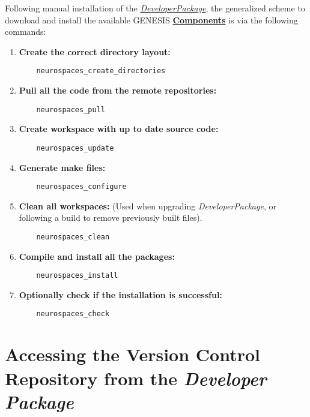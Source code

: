 \documentclass[12pt]{article}
\begin{document}
Following manual installation of the \href{../developer-package/developer-package.tex}{\it DeveloperPackage}, the generalized scheme to download and install the available GENESIS \href{../reserved-words/reserved-words.tex}{\bf Components} is via the following commands:

\begin{enumerate}
\item {\bf Create the correct directory layout:}
\begin{verbatim}
	neurospaces_create_directories
\end{verbatim}
  
\item {\bf Pull all the code from the remote repositories:}
\begin{verbatim}
	neurospaces_pull
\end{verbatim}

\item {\bf Create workspace with up to date source code:}
\begin{verbatim}
	neurospaces_update
\end{verbatim}

\item {\bf Generate make files:}
\begin{verbatim}
	neurospaces_configure
\end{verbatim}

\item {\bf Clean all workspaces:} (Used when upgrading {\it DeveloperPackage}, or following a build to remove previously built files).
\begin{verbatim}
	neurospaces_clean
\end{verbatim}

\item {\bf Compile and install all the packages:}
\begin{verbatim}
	neurospaces_install
\end{verbatim}

\item {\bf Optionally check if the installation is successful:}
\begin{verbatim}
	neurospaces_check
\end{verbatim}

\end{enumerate}

\section*{Accessing the Version Control Repository from the {\it Developer Package}}
\end{document}
